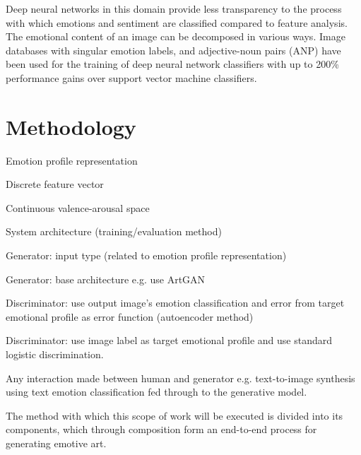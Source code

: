 \documentclass{article}
\begin{document}
Deep neural networks in this domain provide less transparency to the process with which emotions and sentiment are classified compared to feature analysis.
The emotional content of an image can be decomposed in various ways.
Image databases with singular emotion labels, and adjective-noun pairs (ANP) have been used for the training of deep neural network classifiers \citep{chen2014deepsentibank, yang2018visual} with up to 200\% performance gains over support vector machine classifiers.


\section{Methodology}

\begin{todolist}
	\item Emotion profile representation
	\begin{todolist}
		\item Discrete feature vector
		\item Continuous valence-arousal space
	\end{todolist}
	\item System architecture (training/evaluation method)
	\begin{todolist}
		\item Generator: input type (related to emotion profile representation)
		\item Generator: base architecture e.g. use ArtGAN \citep{tan2017artgan}
		\item Discriminator: use output image's emotion classification and error from target emotional profile as error function (autoencoder method)
		\item Discriminator: use image label as target emotional profile and use standard logistic discrimination.
	\end{todolist}
	\item Any interaction made between human and generator e.g. text-to-image synthesis using text emotion classification fed through to the generative model.
	
\end{todolist}

The method with which this scope of work will be executed is divided into its components, which through composition form an end-to-end process for generating emotive art.
\end{document}
